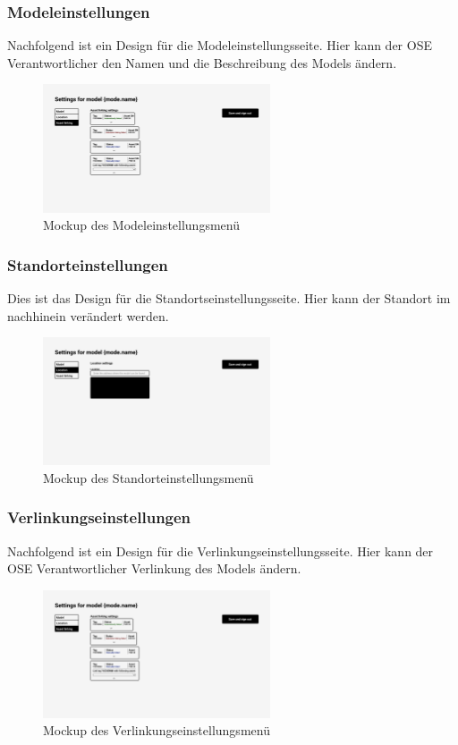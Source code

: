 \subsubsection{Modeleinstellungen}
Nachfolgend ist ein Design für die Modeleinstellungsseite. Hier kann der OSE Verantwortlicher den Namen und die Beschreibung des Models ändern.
\begin{figure}[H]
  \centering
  \includegraphics[angle=270,width=0.6\textwidth]{./mockups/settings/Model.pdf}
  \caption[{Mockup des Modeleinstellungsmenü}]{Mockup des Modeleinstellungsmenü}
  \label{fig:mck-model}
\end{figure}
\pagebreak
\subsubsection{Standorteinstellungen}
Dies ist das Design für die Standortseinstellungsseite. Hier kann der Standort im nachhinein verändert werden.
\begin{figure}[H]
  \centering
  \includegraphics[angle=270,width=0.6\textwidth]{./mockups/settings/Model-1.pdf}
  \caption[{Mockup des Standorteinstellungsmenü}]{Mockup des Standorteinstellungsmenü}
  \label{fig:mck-model_1}
\end{figure}
\pagebreak
\subsubsection{Verlinkungseinstellungen}
Nachfolgend ist ein Design für die Verlinkungseinstellungsseite. Hier kann der OSE Verantwortlicher Verlinkung des Models ändern.
\begin{figure}[H]
  \centering
  \includegraphics[angle=270,width=0.6\textwidth]{./mockups/settings/Model-2.pdf}
  \caption[{Mockup des Verlinkungseinstellungsmenü}]{Mockup des Verlinkungseinstellungsmenü}
  \label{fig:mck-model_2}
\end{figure}
